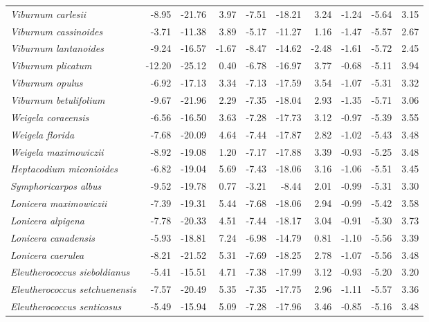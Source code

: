 \documentclass[11pt]{article}
\begin{document}
\begin{longtable}{lrrrrrrrrr}
  \emph{Viburnum carlesii} & -8.95 & -21.76 & 3.97 & -7.51 & -18.21 & 3.24 & -1.24 & -5.64 & 3.15 \\ 
  \emph{Viburnum cassinoides} & -3.71 & -11.38 & 3.89 & -5.17 & -11.27 & 1.16 & -1.47 & -5.57 & 2.67 \\ 
  \emph{Viburnum lantanoides} & -9.24 & -16.57 & -1.67 & -8.47 & -14.62 & -2.48 & -1.61 & -5.72 & 2.45 \\ 
  \emph{Viburnum plicatum} & -12.20 & -25.12 & 0.40 & -6.78 & -16.97 & 3.77 & -0.68 & -5.11 & 3.94 \\ 
  \emph{Viburnum opulus} & -6.92 & -17.13 & 3.34 & -7.13 & -17.59 & 3.54 & -1.07 & -5.31 & 3.32 \\ 
  \emph{Viburnum betulifolium} & -9.67 & -21.96 & 2.29 & -7.35 & -18.04 & 2.93 & -1.35 & -5.71 & 3.06 \\ 
  \emph{Weigela coraeensis} & -6.56 & -16.50 & 3.63 & -7.28 & -17.73 & 3.12 & -0.97 & -5.39 & 3.55 \\ 
  \emph{Weigela florida} & -7.68 & -20.09 & 4.64 & -7.44 & -17.87 & 2.82 & -1.02 & -5.43 & 3.48 \\ 
  \emph{Weigela maximowiczii} & -8.92 & -19.08 & 1.20 & -7.17 & -17.88 & 3.39 & -0.93 & -5.25 & 3.48 \\ 
  \emph{Heptacodium miconioides} & -6.82 & -19.04 & 5.69 & -7.43 & -18.06 & 3.16 & -1.06 & -5.51 & 3.45 \\ 
  \emph{Symphoricarpos albus} & -9.52 & -19.78 & 0.77 & -3.21 & -8.44 & 2.01 & -0.99 & -5.31 & 3.30 \\ 
  \emph{Lonicera maximowiczii} & -7.39 & -19.31 & 5.44 & -7.68 & -18.06 & 2.94 & -0.99 & -5.42 & 3.58 \\ 
  \emph{Lonicera alpigena} & -7.78 & -20.33 & 4.51 & -7.44 & -18.17 & 3.04 & -0.91 & -5.30 & 3.73 \\ 
  \emph{Lonicera canadensis} & -5.93 & -18.81 & 7.24 & -6.98 & -14.79 & 0.81 & -1.10 & -5.56 & 3.39 \\ 
  \emph{Lonicera caerulea} & -8.21 & -21.52 & 5.31 & -7.69 & -18.25 & 2.78 & -1.07 & -5.56 & 3.48 \\ 
  \emph{Eleutherococcus sieboldianus} & -5.41 & -15.51 & 4.71 & -7.38 & -17.99 & 3.12 & -0.93 & -5.20 & 3.20 \\ 
  \emph{Eleutherococcus setchuenensis} & -7.57 & -20.49 & 5.35 & -7.35 & -17.75 & 2.96 & -1.11 & -5.57 & 3.36 \\ 
  \emph{Eleutherococcus senticosus} & -5.49 & -15.94 & 5.09 & -7.28 & -17.96 & 3.46 & -0.85 & -5.16 & 3.48 \\ 

\end{longtable}
\end{document}
